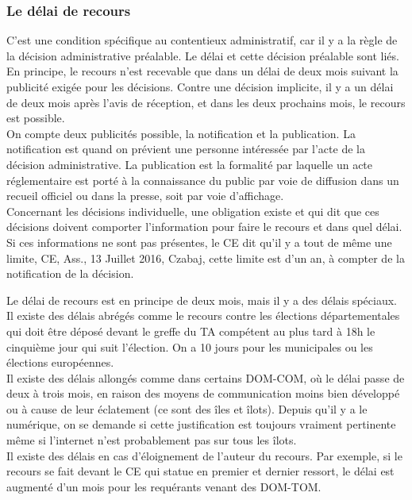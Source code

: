 \documentclass[10pt, a4paper, openany]{book}
\begin{document}
\subsubsection{Le délai de recours}

C'est une condition spécifique au contentieux administratif, car il y a la règle de la décision administrative préalable. Le délai et cette décision préalable sont liés. \\
En principe, le recours n'est recevable que dans un délai de deux mois suivant la publicité exigée pour les décisions. Contre une décision implicite, il y a un délai de deux mois après l'avis de réception, et dans les deux prochains mois, le recours est possible. \\
On compte deux publicités possible, la notification et la publication. La notification est quand on prévient une personne intéressée par l'acte de la décision administrative. La publication est la formalité par laquelle un acte réglementaire est porté à la connaissance du public par voie de diffusion dans un recueil officiel ou dans la presse, soit par voie d'affichage. \\
Concernant les décisions individuelle, une obligation existe et qui dit que ces décisions doivent comporter l'information pour faire le recours et dans quel délai. Si ces informations ne sont pas présentes, le CE dit qu'il y a tout de même une limite, CE, Ass., 13 Juillet 2016, Czabaj, cette limite est d'un an, à compter de la notification de la décision.


Le délai de recours est en principe de deux mois, mais il y a des délais spéciaux. \\
Il existe des délais abrégés comme le recours contre les élections départementales qui doit être déposé devant le greffe du TA compétent au plus tard à 18h le cinquième jour qui suit l'élection. On a 10 jours pour les municipales ou les élections européennes. \\
Il existe des délais allongés comme dans certains DOM-COM, où le délai passe de deux à trois mois, en raison des moyens de communication moins bien développé ou à cause de leur éclatement (ce sont des îles et îlots). Depuis qu'il y a le numérique, on se demande si cette justification est toujours vraiment pertinente même si l'internet n'est probablement pas sur tous les îlots. \\
Il existe des délais en cas d'éloignement de l'auteur du recours. Par exemple, si le recours se fait devant le CE qui statue en premier et dernier ressort, le délai est augmenté d'un mois pour les requérants venant des DOM-TOM. 
\end{document}
